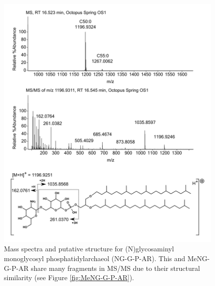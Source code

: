 \begin{figure}[h]
\centering
\includegraphics[width=\linewidth]{figs_app1/NG-G-P-AR}
\caption[Mass spectra and putative structure for (N)glycosaminyl monoglycosyl phosphatidylarchaeol (NG-G-P-AR)]{Mass spectra and putative structure for (N)glycosaminyl monoglycosyl phosphatidylarchaeol (NG-G-P-AR). This and MeNG-G-P-AR share many fragments in MS/MS due to their structural similarity (see Figure \ref{fig:MeNG-G-P-AR}).}
\label{fig:NG-G-P-AR_percent}
\end{figure}

